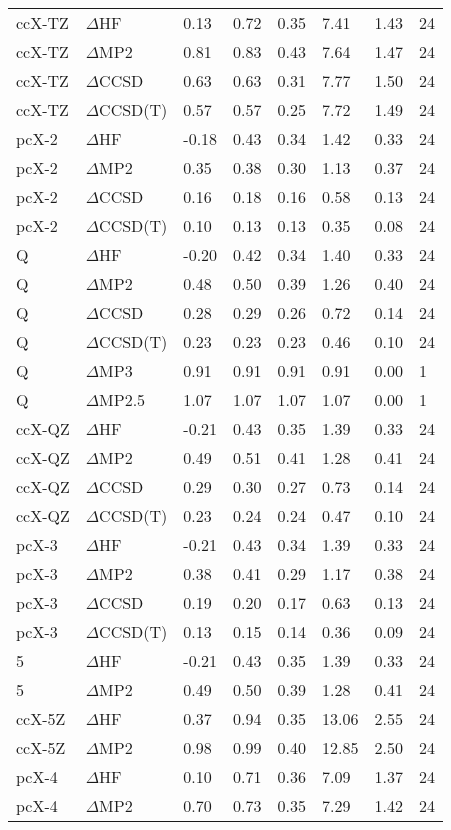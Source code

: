 \begin{table}
\begin{tabular}{l l l l l l l l }
    ccX-TZ & $\Delta$HF & 0.13 & 0.72 & 0.35 & 7.41 & 1.43 & 24 \\ 
    ccX-TZ & $\Delta$MP2 & 0.81 & 0.83 & 0.43 & 7.64 & 1.47 & 24 \\ 
    ccX-TZ & $\Delta$CCSD & 0.63 & 0.63 & 0.31 & 7.77 & 1.50 & 24 \\ 
    ccX-TZ & $\Delta$CCSD(T) & 0.57 & 0.57 & 0.25 & 7.72 & 1.49 & 24 \\ 
    pcX-2 & $\Delta$HF & -0.18 & 0.43 & 0.34 & 1.42 & 0.33 & 24 \\ 
    pcX-2 & $\Delta$MP2 & 0.35 & 0.38 & 0.30 & 1.13 & 0.37 & 24 \\ 
    pcX-2 & $\Delta$CCSD & 0.16 & 0.18 & 0.16 & 0.58 & 0.13 & 24 \\ 
    pcX-2 & $\Delta$CCSD(T) & 0.10 & 0.13 & 0.13 & 0.35 & 0.08 & 24 \\ 
    Q & $\Delta$HF & -0.20 & 0.42 & 0.34 & 1.40 & 0.33 & 24 \\ 
    Q & $\Delta$MP2 & 0.48 & 0.50 & 0.39 & 1.26 & 0.40 & 24 \\ 
    Q & $\Delta$CCSD & 0.28 & 0.29 & 0.26 & 0.72 & 0.14 & 24 \\ 
    Q & $\Delta$CCSD(T) & 0.23 & 0.23 & 0.23 & 0.46 & 0.10 & 24 \\ 
    Q & $\Delta$MP3 & 0.91 & 0.91 & 0.91 & 0.91 & 0.00 & 1 \\ 
    Q & $\Delta$MP2.5 & 1.07 & 1.07 & 1.07 & 1.07 & 0.00 & 1 \\ 
    ccX-QZ & $\Delta$HF & -0.21 & 0.43 & 0.35 & 1.39 & 0.33 & 24 \\ 
    ccX-QZ & $\Delta$MP2 & 0.49 & 0.51 & 0.41 & 1.28 & 0.41 & 24 \\ 
    ccX-QZ & $\Delta$CCSD & 0.29 & 0.30 & 0.27 & 0.73 & 0.14 & 24 \\ 
    ccX-QZ & $\Delta$CCSD(T) & 0.23 & 0.24 & 0.24 & 0.47 & 0.10 & 24 \\ 
    pcX-3 & $\Delta$HF & -0.21 & 0.43 & 0.34 & 1.39 & 0.33 & 24 \\ 
    pcX-3 & $\Delta$MP2 & 0.38 & 0.41 & 0.29 & 1.17 & 0.38 & 24 \\ 
    pcX-3 & $\Delta$CCSD & 0.19 & 0.20 & 0.17 & 0.63 & 0.13 & 24 \\ 
    pcX-3 & $\Delta$CCSD(T) & 0.13 & 0.15 & 0.14 & 0.36 & 0.09 & 24 \\ 
    5 & $\Delta$HF & -0.21 & 0.43 & 0.35 & 1.39 & 0.33 & 24 \\ 
    5 & $\Delta$MP2 & 0.49 & 0.50 & 0.39 & 1.28 & 0.41 & 24 \\ 
    ccX-5Z & $\Delta$HF & 0.37 & 0.94 & 0.35 & 13.06 & 2.55 & 24 \\ 
    ccX-5Z & $\Delta$MP2 & 0.98 & 0.99 & 0.40 & 12.85 & 2.50 & 24 \\ 
    pcX-4 & $\Delta$HF & 0.10 & 0.71 & 0.36 & 7.09 & 1.37 & 24 \\ 
    pcX-4 & $\Delta$MP2 & 0.70 & 0.73 & 0.35 & 7.29 & 1.42 & 24 \\ 
    \bottomrule
  \end{tabular}
\end{table}
